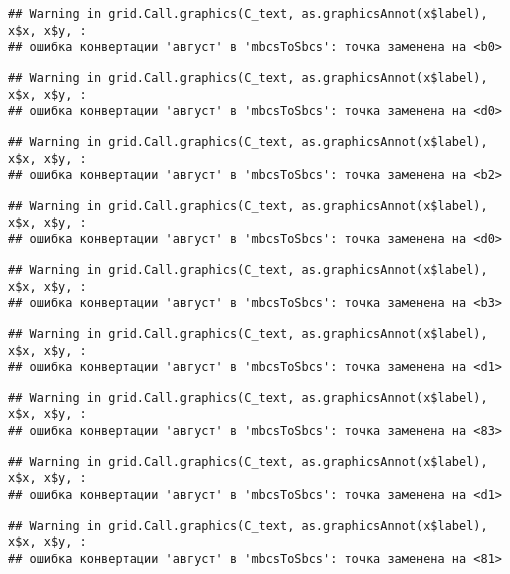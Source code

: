\documentclass[
]{article}
\begin{document}
\begin{verbatim}
## Warning in grid.Call.graphics(C_text, as.graphicsAnnot(x$label), x$x, x$y, :
## ошибка конвертации 'август' в 'mbcsToSbcs': точка заменена на <b0>
\end{verbatim}

\begin{verbatim}
## Warning in grid.Call.graphics(C_text, as.graphicsAnnot(x$label), x$x, x$y, :
## ошибка конвертации 'август' в 'mbcsToSbcs': точка заменена на <d0>
\end{verbatim}

\begin{verbatim}
## Warning in grid.Call.graphics(C_text, as.graphicsAnnot(x$label), x$x, x$y, :
## ошибка конвертации 'август' в 'mbcsToSbcs': точка заменена на <b2>
\end{verbatim}

\begin{verbatim}
## Warning in grid.Call.graphics(C_text, as.graphicsAnnot(x$label), x$x, x$y, :
## ошибка конвертации 'август' в 'mbcsToSbcs': точка заменена на <d0>
\end{verbatim}

\begin{verbatim}
## Warning in grid.Call.graphics(C_text, as.graphicsAnnot(x$label), x$x, x$y, :
## ошибка конвертации 'август' в 'mbcsToSbcs': точка заменена на <b3>
\end{verbatim}

\begin{verbatim}
## Warning in grid.Call.graphics(C_text, as.graphicsAnnot(x$label), x$x, x$y, :
## ошибка конвертации 'август' в 'mbcsToSbcs': точка заменена на <d1>
\end{verbatim}

\begin{verbatim}
## Warning in grid.Call.graphics(C_text, as.graphicsAnnot(x$label), x$x, x$y, :
## ошибка конвертации 'август' в 'mbcsToSbcs': точка заменена на <83>
\end{verbatim}

\begin{verbatim}
## Warning in grid.Call.graphics(C_text, as.graphicsAnnot(x$label), x$x, x$y, :
## ошибка конвертации 'август' в 'mbcsToSbcs': точка заменена на <d1>
\end{verbatim}

\begin{verbatim}
## Warning in grid.Call.graphics(C_text, as.graphicsAnnot(x$label), x$x, x$y, :
## ошибка конвертации 'август' в 'mbcsToSbcs': точка заменена на <81>
\end{verbatim}
\end{document}
